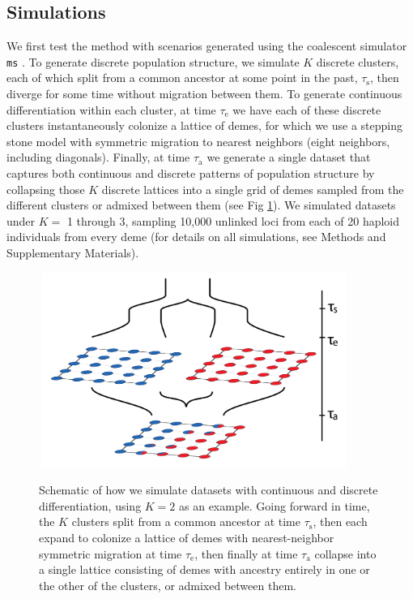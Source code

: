 \documentclass[12pt]{article}
\begin{document}
\subsection*{Simulations}
We first test the method with scenarios generated using the coalescent simulator \texttt{ms} \citep{Hudson2002}.
To generate discrete population structure, we simulate $K$ discrete clusters,
each of which split from a common ancestor at some point in the past, $\tau_{\text{s}}$,
then diverge for some time without migration between them.
To generate continuous differentiation within each cluster,
at time $\tau_{\text{e}}$ we have each of these discrete clusters instantaneously colonize a lattice of demes,
for which we use a stepping stone model with symmetric migration 
to nearest neighbors (eight neighbors, including diagonals).
Finally, at time $\tau_{\text{a}}$ we generate a single dataset that captures both continuous and discrete patterns of population structure 
by collapsing those $K$ discrete lattices into a single grid of demes sampled from the different clusters
or admixed between them (see Fig \ref{sim_setup}).
We simulated datasets under $K =$ 1 through 3, 
sampling 10,000 unlinked loci from each of 20 haploid individuals from every deme
(for details on all simulations, see Methods and Supplementary Materials).

\begin{figure}
	\centering
		{\includegraphics[width=4in,height=2.5in]{figs/sims/sim_setup.png}}
		\caption{Schematic of how we simulate datasets with continuous and discrete differentiation, using $K=2$ as an example.  
			    Going forward in time, the $K$ clusters split from a common ancestor at time $\tau_{\text{s}}$,
			    then each expand to colonize a lattice of demes with nearest-neighbor symmetric migration at time $\tau_{\text{e}}$,
			    then finally at time $\tau_{\text{a}}$ collapse into a single lattice consisting of demes 
			    with ancestry entirely in one or the other of the clusters,
			    or admixed between them.
			    }\label{sim_setup}
\end{figure}
\end{document}
